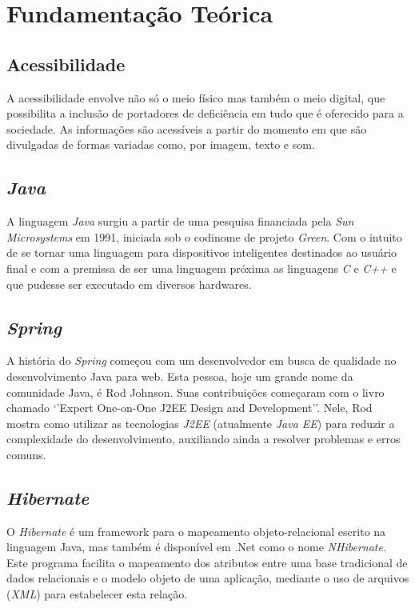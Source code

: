 \chapter{Fundamentação Teórica}

\section{Acessibilidade}
A acessibilidade envolve não só o meio físico mas também o meio digital, que possibilita a inclusão de portadores de deficiência em tudo que é oferecido para a sociedade. As informações são acessíveis a partir do momento em que são divulgadas de formas variadas como, por imagem, texto e som. \cite{torres2002acessibilidade}

\section{\textit{Java}}
A linguagem \textit{Java} surgiu a partir de uma pesquisa financiada pela \textit{Sun Microsystems} em 1991, iniciada sob o codinome de projeto \textit{Green}. Com o intuito de se tornar uma linguagem para dispositivos inteligentes destinados ao usuário final e com a premissa de ser uma linguagem próxima as linguagens \textit{C} e\textit{ C++} e que pudesse ser executado em diversos hardwares. \cite{java}

\section{\textit{Spring}}
A história do \textit{Spring} começou com um desenvolvedor em busca de qualidade no desenvolvimento Java para web. Esta pessoa, hoje um grande nome da comunidade Java, é Rod Johnson. Suas contribuições começaram com o livro chamado ‘’Expert One-on-One J2EE Design and Development’’. Nele, Rod mostra como utilizar as tecnologias \textit{J2EE} (atualmente \textit{Java EE}) para reduzir a complexidade do desenvolvimento, auxiliando ainda a resolver problemas e erros comuns. \cite{spring}

\section{\textit{Hibernate}}
O \textit{Hibernate} é um framework para o mapeamento objeto-relacional escrito na linguagem Java, mas também é disponível em .Net como o nome \textit{NHibernate}. Este programa facilita o mapeamento dos atributos entre uma base tradicional de dados relacionais e o modelo objeto de uma aplicação, mediante o uso de arquivos (\textit{XML}) para estabelecer esta relação. \cite{hibernate}

